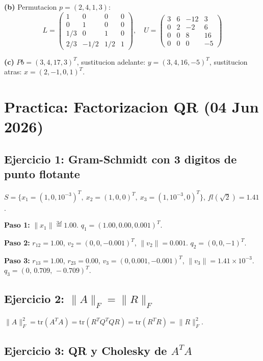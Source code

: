 \documentclass[11pt,a4paper]{article}
\begin{document}
\textbf{(b)} Permutacion $p=(2,4,1,3)$:
\[
  L = \begin{pmatrix}1&0&0&0\\0&1&0&0\\1/3&0&1&0\\2/3&-1/2&1/2&1\end{pmatrix}, \quad
  U = \begin{pmatrix}3&6&-12&3\\0&2&-2&6\\0&0&8&16\\0&0&0&-5\end{pmatrix}
\]

\textbf{(c)} $Pb=(3,4,17,3)^T$, sustitucion adelante: $y=(3,4,16,-5)^T$,
sustitucion atras: $x=(2,-1,0,1)^T$.

\section{Practica: Factorizacion QR (04 Jun 2026)}
\label{sec:practica_qr}

\subsection{Ejercicio 1: Gram-Schmidt con 3 digitos de punto flotante}

$S=\{x_1=(1,0,10^{-3})^T,\ x_2=(1,0,0)^T,\ x_3=(1,10^{-3},0)^T\}$,
$fl(\sqrt{2})=1.41$.

\textbf{Paso 1:} $\|x_1\|\overset{3d}{=}1.00$. $q_1=(1.00,0.00,0.001)^T$.

\textbf{Paso 2:} $r_{12}=1.00$, $v_2=(0,0,-0.001)^T$, $\|v_2\|=0.001$.
$q_2=(0,0,-1)^T$.

\textbf{Paso 3:} $r_{13}=1.00$, $r_{23}=0.00$, $v_3=(0,0.001,-0.001)^T$,
$\|v_3\|=1.41\times10^{-3}$.
$q_3=(0,\,0.709,\,-0.709)^T$.

\subsection{Ejercicio 2: $\|A\|_F = \|R\|_F$}

$\|A\|_F^2 = \text{tr}(A^TA) = \text{tr}(R^TQ^TQR) = \text{tr}(R^TR) = \|R\|_F^2$.

\subsection{Ejercicio 3: QR y Cholesky de $A^TA$}
\end{document}
